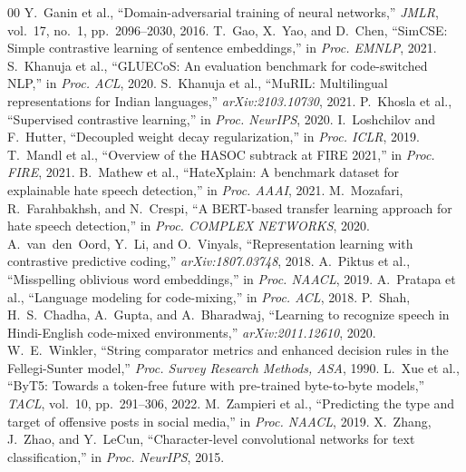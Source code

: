 \documentclass[conference]{IEEEtran}
\begin{document}
\begin{thebibliography}{00}
 Y.~Ganin et al., ``Domain-adversarial training of neural networks,'' \textit{JMLR}, vol.~17, no.~1, pp.~2096--2030, 2016.
 T.~Gao, X.~Yao, and D.~Chen, ``SimCSE: Simple contrastive learning of sentence embeddings,'' in \textit{Proc. EMNLP}, 2021.
 S.~Khanuja et al., ``GLUECoS: An evaluation benchmark for code-switched NLP,'' in \textit{Proc. ACL}, 2020.
 S.~Khanuja et al., ``MuRIL: Multilingual representations for Indian languages,'' \textit{arXiv:2103.10730}, 2021.
 P.~Khosla et al., ``Supervised contrastive learning,'' in \textit{Proc. NeurIPS}, 2020.
 I.~Loshchilov and F.~Hutter, ``Decoupled weight decay regularization,'' in \textit{Proc. ICLR}, 2019.
 T.~Mandl et al., ``Overview of the HASOC subtrack at FIRE 2021,'' in \textit{Proc. FIRE}, 2021.
 B.~Mathew et al., ``HateXplain: A benchmark dataset for explainable hate speech detection,'' in \textit{Proc. AAAI}, 2021.
 M.~Mozafari, R.~Farahbakhsh, and N.~Crespi, ``A BERT-based transfer learning approach for hate speech detection,'' in \textit{Proc. COMPLEX NETWORKS}, 2020.
 A.~van~den~Oord, Y.~Li, and O.~Vinyals, ``Representation learning with contrastive predictive coding,'' \textit{arXiv:1807.03748}, 2018.
 A.~Piktus et al., ``Misspelling oblivious word embeddings,'' in \textit{Proc. NAACL}, 2019.
 A.~Pratapa et al., ``Language modeling for code-mixing,'' in \textit{Proc. ACL}, 2018.
 P.~Shah, H.~S.~Chadha, A.~Gupta, and A.~Bharadwaj, ``Learning to recognize speech in Hindi-English code-mixed environments,'' \textit{arXiv:2011.12610}, 2020.
 W.~E.~Winkler, ``String comparator metrics and enhanced decision rules in the Fellegi-Sunter model,'' \textit{Proc. Survey Research Methods, ASA}, 1990.
 L.~Xue et al., ``ByT5: Towards a token-free future with pre-trained byte-to-byte models,'' \textit{TACL}, vol.~10, pp.~291--306, 2022.
 M.~Zampieri et al., ``Predicting the type and target of offensive posts in social media,'' in \textit{Proc. NAACL}, 2019.
 X.~Zhang, J.~Zhao, and Y.~LeCun, ``Character-level convolutional networks for text classification,'' in \textit{Proc. NeurIPS}, 2015.
\end{thebibliography}
\end{document}
